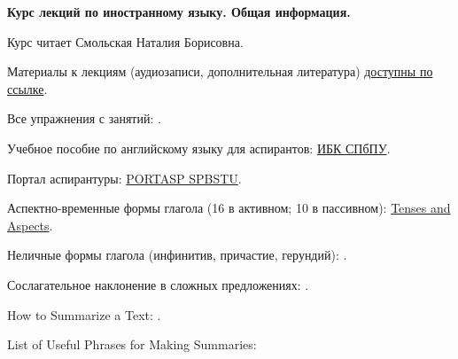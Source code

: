 \documentclass[main.tex]{subfiles}
\begin{document}
{\parindent0pt

\textbf{Курс лекций по иностранному языку. Общая информация.}

Курс читает Смольская Наталия Борисовна.

Материалы к лекциям (аудиозаписи, дополнительная литература) \href{https://drive.google.com/drive/folders/1iSx2EjJJ98rhPpOsM4xGcJA7-7qitQHM?usp=sharing}{доступны по ссылке}.

Все упражнения с занятий: \hyperref[sec:all-tasks-lk]{\color{blue}{УПРАЖНЕНИЯ}}.

Учебное пособие по английскому языку для аспирантов: \href{https://elib.spbstu.ru/dl/2/s19-119.pdf/info}{ИБК СПбПУ}.

Портал аспирантуры: \href{https://portasp.spbstu.ru/login/index.php}{PORTASP SPBSTU}.

Аспектно-временные формы глагола (16 в активном; 10 в пассивном): \href{https://mualal.github.io/asp/english/EnglishTensesAspectsVoicesPoster.pdf}{Tenses and Aspects}.

Неличные формы глагола (инфинитив, причастие, герундий): \hyperref[subsec:impersonal-lk]{\color{blue}{Impersonal Forms}}.

Сослагательное наклонение в сложных предложениях: \hyperref[subsec:subjunctive-mood-lk]{\color{blue}{Subjunctive Mood}}.

How to Summarize a Text: \hyperref[subsec:tips-on-summarizing]{\color{blue}{Tips on Summarizing}}.

List of Useful Phrases for Making Summaries: \hyperref[subsec:list-of-useful-phrases-for-making-summaries]{\color{blue}{LIST OF PHRASES}}

}
\end{document}
